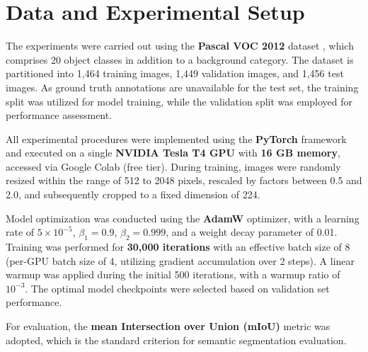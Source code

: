 \section{Data and Experimental Setup}
\label{subsec:data_and_experimental_setup}

The experiments were carried out using the \textbf{Pascal VOC 2012} dataset \cite{dataset_pascal_voc}, which comprises 20 object classes in addition to a background category. The dataset is partitioned into 1,464 training images, 1,449 validation images, and 1,456 test images. As ground truth annotations are unavailable for the test set, the training split was utilized for model training, while the validation split was employed for performance assessment.

All experimental procedures were implemented using the \textbf{PyTorch} framework and executed on a single \textbf{NVIDIA Tesla T4 GPU} with \textbf{16 GB memory}, accessed via Google Colab (free tier). During training, images were randomly resized within the range of 512 to 2048 pixels, rescaled by factors between 0.5 and 2.0, and subsequently cropped to a fixed dimension of 224.

Model optimization was conducted using the \textbf{AdamW} optimizer, with a learning rate of $5 \times 10^{-5}$, $\beta_1 = 0.9$, $\beta_2 = 0.999$, and a weight decay parameter of 0.01. Training was performed for \textbf{30,000 iterations} with an effective batch size of 8 (per-GPU batch size of 4, utilizing gradient accumulation over 2 steps). A linear warmup was applied during the initial 500 iterations, with a warmup ratio of $10^{-3}$. The optimal model checkpoints were selected based on validation set performance.

For evaluation, the \textbf{mean Intersection over Union (mIoU)} metric was adopted, which is the standard criterion for semantic segmentation evaluation.
